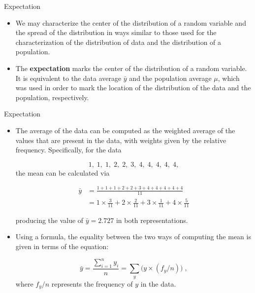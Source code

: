 \documentclass[10pt]{beamer}\usepackage[]{graphicx}\usepackage[]{color}
\begin{document}
\begin{frame}[fragile]{Expectation}
	\small
	\begin{itemize}[<+->]
		
		\item We may characterize the center of the distribution of a random variable
		and the spread of the distribution in ways similar to those used for the
		characterization of the distribution of data and the distribution of a
		population.
		
		\item The \textbf{expectation} marks the center of the distribution of a random
		variable. It is equivalent to the data average $\bar y$ and the
		population average $\mu$, which was used in order to mark the location
		of the distribution of the data and the population, respectively.
		

	\end{itemize}
	
\end{frame}



\begin{frame}[fragile]{Expectation}
	\small
	\begin{itemize}[<+->]
		
		\item The average of the data can be computed as the weighted average of the values that are present
		in the data, with weights given by the relative frequency. Specifically,
		for the data
		
		$$1,\; 1,\; 1,\; 2,\; 2,\; 3,\; 4,\; 4,\; 4,\; 4,\; 4,$$ the mean can be calculated via
		
		\begin{align*}
			\bar{y} &= \frac{1 + 1 + 1 + 2 + 2 + 3 + 4 + 4 + 4 + 4 + 4}{11}\\
			& =	1\times \frac{3}{11} + 2 \times \frac{2}{11} + 3 \times \frac{1}{11} + 4 \times \frac{5}{11}
		\end{align*}

		producing the value of $\bar y =2.727$ in both representations. 
		
		\item Using a formula, the equality between the two ways of computing the mean is
		given in terms of the equation:
		
		$$\bar y = \frac{\sum_{i=1}^n y_i}{n} = \sum_y \big(y \times (f_y/n)\big)\;,$$
		where $f_y/n$ represents the frequency of $y$ in the data. 
		

		
		
	\end{itemize}
	
\end{frame}
\end{document}
